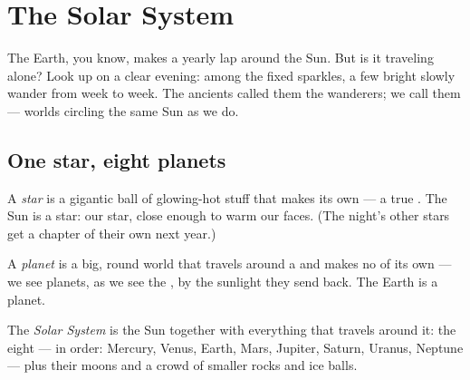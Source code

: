 \chapter{The Solar System}\label{ch:g4:solar-system}

The Earth, you know, makes a yearly lap around the Sun. But is it
traveling alone? Look up on a clear evening: among the fixed
sparkles, a few bright  slowly wander from week to week. The
ancients called them the wanderers; we call them  --- worlds
circling the same Sun as we do.

\section{One star, eight planets}

\begin{definition}[Star]\label{def:g4:solar-system:star}
A \emph{star} is a gigantic ball of glowing-hot stuff
that makes its own  --- a true . The Sun is a
star: our star, close enough to warm our faces. (The night's other
stars get a chapter of their own next year.)
\end{definition}

\begin{definition}[Planet]\label{def:g4:solar-system:planet}
A \emph{planet} is a big, round world that travels
around a  and makes no  of its own --- we see planets, as
we see the , by the sunlight they send back. The Earth is a
planet.
\end{definition}

\begin{definition}\label{def:g4:solar-system:family}
The \emph{Solar System} is the Sun together
with everything that travels around it: the eight  --- in order: Mercury, Venus, Earth, Mars, Jupiter, Saturn,
Uranus, Neptune --- plus their moons and a crowd of smaller rocks
and ice balls.
\end{definition}

